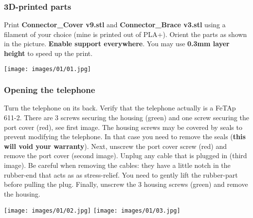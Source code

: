\documentclass[]{article}
\begin{document}
\subsubsection{3D-printed parts}
\begin{minipage}[t]{0.4\linewidth}
	\vspace{0pt}
	Print \textbf{Connector\_Cover v9.stl} and \textbf{Connector\_Brace v3.stl} using a filament of your choice (mine is printed out of PLA+). Orient the parts as shown in the picture. \textbf{Enable support everywhere}. You may use \textbf{0.3mm layer height} to speed up the print.
\end{minipage}
\hfill
\begin{minipage}[t]{0.5\linewidth}
	\vspace{0pt}
	\texttt{[image: images/01/01.jpg]}
\end{minipage}

\subsubsection{Opening the telephone}
\begin{minipage}[t]{0.4\linewidth}
	\vspace{0pt}
	Turn the telephone on its back. Verify that the telephone actually is a FeTAp 611-2. There are 3 screws securing the housing (green) and one screw securing the port cover (red), see first image. The housing screws may be covered by seals to prevent modifying the telephone. In that case you need to remove the seals (\textbf{this will void your warranty}).
	\newline
	\newline
	Next, unscrew the port cover screw (red) and remove the port cover (second image). Unplug any cable that is plugged in (third image). Be careful when removing the cables: they have a little notch in the rubber-end that acts as as stress-relief. You need to gently lift the rubber-part before pulling the plug.
	\newline
	\newline
	Finally, unscrew the 3 housing screws (green) and remove the housing.
\end{minipage}
\hfill
\begin{minipage}[t]{0.5\linewidth}
	\vspace{0pt}
	\texttt{[image: images/01/02.jpg]}
	\texttt{[image: images/01/03.jpg]}
\end{minipage}
\end{document}
